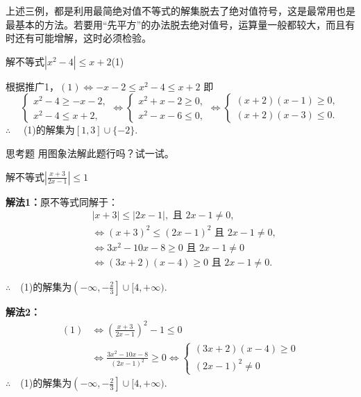 \begin{rmk}
上述三例，都是利用最简绝对值不等式的解集脱去了绝对值符号，这是最常用也是最基本的方法。若要用“先平方”的办法脱去绝对值号，运算量一般都较大，而且有时还有可能增解，这时必须检验。
\end{rmk}

\begin{example}
    解不等式$\left|x^2-4\right|\le  x+2$\hfill (1)
\end{example}

\begin{solution}
    根据推广1，$(1)\Longleftrightarrow-x-2\le  x^{2}-4\le  x+2$
即
\[\begin{cases}x^{2}-4\geqslant-x-2,\\
    x^{2}-4\leqslant x+2,
\end{cases}\Longleftrightarrow
\begin{cases}
    x^{2}+x-2\geqslant0,\\
    x^{2}-x-6\leqslant0,
\end{cases}\Longleftrightarrow\begin{cases}(x+2)(x-1)\geqslant0,\\
    (x+2)(x-3)\leqslant0.
\end{cases}\]
$\therefore\quad $ (1)的解集为$[1,3]\cup \{-2\}$.
\end{solution}

\begin{thm}{思考题}
    用图象法解此题行吗？试一试。
\end{thm}

\begin{example}
    解不等式$\left|\frac{x+3}{2x-1}\right|\leqslant1$
\end{example}

\begin{solution}
\textbf{解法1：}原不等式同解于：
\[\begin{split}
    &|x+3|\leqslant|2x-1|, \text{ 且 } 2x-1\neq0,\\
&\Longleftrightarrow (x+3)^{2}\leqslant(2x-1)^{2}\text{ 且 }2x-1\neq0,\\
&\Longleftrightarrow 3x^{2}-10x-8\geqslant 0\text{ 且 }2x-1\neq0\\
&\Longleftrightarrow(3x+2)(x-4)\geqslant0\text{ 且 }2x-1\neq0.
\end{split}\]

$\therefore\quad $(1)的解集为$\left(-\infty,-\frac23\right]\cup[4,+\infty)$.    

\textbf{解法2：}
\[\begin{split}
    (1)&\Longleftrightarrow \left(\frac{x+3}{2x-1}\right)^2-1\le 0\\
    &\Longleftrightarrow \frac{3x^2-10x-8}{(2x-1)^2}\ge 0 \Longleftrightarrow \begin{cases}
        (3x+2)(x-4)\ge 0\\
        (2x-1)^2\ne 0
    \end{cases}
\end{split} \]
$\therefore\quad $(1)的解集为$\left(-\infty,-\frac{2}{3}\right]\cup [4,+\infty)$.
\end{solution}

